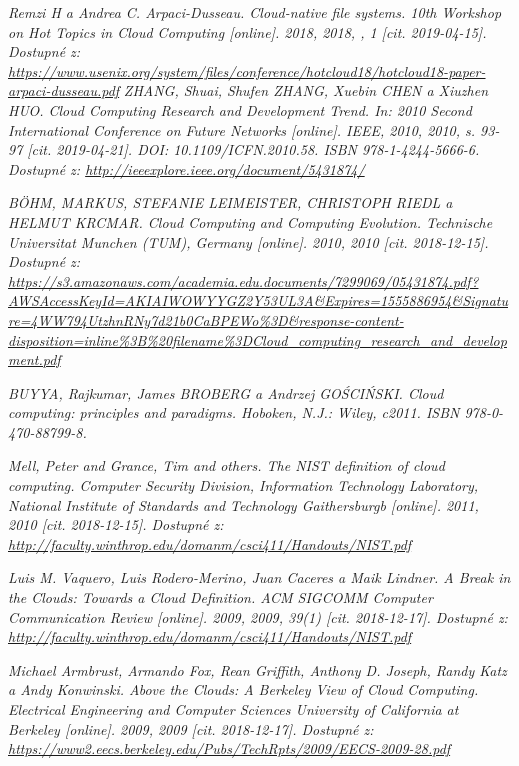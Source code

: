 \begin{thebibliography}{10}
	\emph{Remzi H a Andrea C. Arpaci-Dusseau. Cloud-native file systems. 10th Workshop on Hot Topics in Cloud Computing [online]. 2018, 2018, , 1 [cit. 2019-04-15]. Dostupné z: \url{https://www.usenix.org/system/files/conference/hotcloud18/hotcloud18-paper-arpaci-dusseau.pdf}}
	\emph{ZHANG, Shuai, Shufen ZHANG, Xuebin CHEN a Xiuzhen HUO. Cloud Computing Research and Development Trend. In: 2010 Second International Conference on Future Networks [online]. IEEE, 2010, 2010, s. 93-97 [cit. 2019-04-21]. DOI: 10.1109/ICFN.2010.58. ISBN 978-1-4244-5666-6. Dostupné z: \url{http://ieeexplore.ieee.org/document/5431874/}}

	\emph{BÖHM, MARKUS, STEFANIE LEIMEISTER, CHRISTOPH RIEDL a HELMUT KRCMAR. Cloud Computing and Computing Evolution. Technische Universitat Munchen (TUM), Germany [online]. 2010, 2010 [cit. 2018-12-15]. Dostupné z: \url{https://s3.amazonaws.com/academia.edu.documents/7299069/05431874.pdf?AWSAccessKeyId=AKIAIWOWYYGZ2Y53UL3A&Expires=1555886954&Signature=4WW794UtzhnRNy7d21b0CaBPEWo\%3D&response-content-disposition=inline\%3B\%20filename\%3DCloud_computing_research_and_development.pdf}}

	\emph{BUYYA, Rajkumar, James BROBERG a Andrzej GOŚCIŃSKI. Cloud computing: principles and paradigms. Hoboken, N.J.: Wiley, c2011. ISBN 978-0-470-88799-8.}

	\emph{Mell, Peter and Grance, Tim and others. The NIST definition of cloud computing. Computer Security Division, Information Technology Laboratory, National Institute of Standards and Technology Gaithersburgb [online]. 2011, 2010 [cit. 2018-12-15]. Dostupné z: \url{http://faculty.winthrop.edu/domanm/csci411/Handouts/NIST.pdf}}

	\emph{Luis M. Vaquero, Luis Rodero-Merino, Juan Caceres a Maik Lindner. A Break in the Clouds: Towards a Cloud Definition. ACM SIGCOMM Computer Communication Review [online]. 2009, 2009, 39(1) [cit. 2018-12-17]. Dostupné z: \url{http://faculty.winthrop.edu/domanm/csci411/Handouts/NIST.pdf}}

	\emph{Michael Armbrust, Armando Fox, Rean Griffith, Anthony D. Joseph, Randy Katz a Andy Konwinski. Above the Clouds: A Berkeley View of Cloud Computing. Electrical Engineering and Computer Sciences University of California at Berkeley [online]. 2009, 2009 [cit. 2018-12-17]. Dostupné z: \url{https://www2.eecs.berkeley.edu/Pubs/TechRpts/2009/EECS-2009-28.pdf}}



\end{thebibliography}
